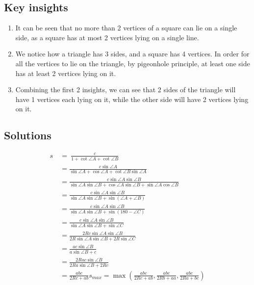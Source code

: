 \documentclass[12pt]{scrartcl}
\begin{document}
\subsection{Key insights}
\begin{enumerate}
	\item It can be seen that no more than 2 vertices of a square can lie on a single side, as a square has at most 2 vertices lying on a single line.
	\item We notice how a triangle has 3 sides, and a square has 4 vertices. In order for all the vertices to lie on the triangle, by pigeonhole principle, at least one side has at least 2 vertices lying on it.
	\item Combining the first 2 insights, we can see that 2 sides of the triangle will have 1 vertices each lying on it, while the other side will have 2 vertices lying on it.
\end{enumerate}

\subsection{Solutions}
\begin{align*}
s\ &=\ \frac{c}{1+\cot \angle A+\cot \angle B} \\
&=\frac{c\sin \angle A}{\sin \angle A+\cos \angle A+\cot \angle B\sin \angle A} \\
&=\frac{c\sin \angle A\sin \angle B}{\sin \angle A\sin \angle B+\cos \angle A\sin \angle B+\sin \angle A\cos \angle B} \\
&=\frac{c\sin \angle A\sin \angle B}{\sin \angle A\sin \angle B+\sin\left(\angle A+\angle B\right)} \\
&=\frac{c\sin \angle A\sin \angle B}{\sin \angle A\sin \angle B+\sin\left(180-\angle C\right)} \\
&=\frac{c\sin \angle A\sin \angle B}{\sin \angle A\sin \angle B+\sin \angle C} \\
&=\frac{2Rc\sin \angle A\sin \angle B}{2R\sin \angle A\sin \angle B+2R\sin \angle C} \\
&=\frac{ac\sin \angle B}{a\sin \angle B+c} \\
&=\frac{2Rac\sin \angle B}{2Ra\sin \angle B+2Rc} \\
&=\frac{abc}{2Rc+ab}
s_{max}=\max\left(\frac{abc}{2Rc+ab},\frac{abc}{2Rb+aa},\frac{abc}{2Ra+bc}\right)
\end{align*}


\printbibliography
\end{document}
